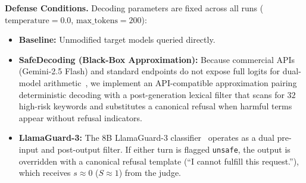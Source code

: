 \documentclass[letterpaper]{article}
\begin{document}
\textbf{Defense Conditions.} Decoding parameters are fixed across all runs ($\text{temperature}=0.0$, $\text{max\_tokens}=200$):
\begin{itemize}
    \item \textbf{Baseline:} Unmodified target models queried directly.
    \item \textbf{SafeDecoding (Black-Box Approximation):} Because commercial APIs (Gemini-2.5 Flash) and standard endpoints do not expose full logits for dual-model arithmetic~\citep{xu2024safedecoding}, we implement an API-compatible approximation pairing deterministic decoding with a post-generation lexical filter that scans for $32$ high-risk keywords and substitutes a canonical refusal when harmful terms appear without refusal indicators.
    \item \textbf{LlamaGuard-3:} The 8B LlamaGuard-3 classifier~\citep{inan2023llamaguard, fedorov2024llama} operates as a dual pre-input and post-output filter. If either turn is flagged \texttt{unsafe}, the output is overridden with a canonical refusal template (``I cannot fulfill this request.''), which receives $s \approx 0$ ($S \approx 1$) from the judge.
\end{itemize}
\end{document}
